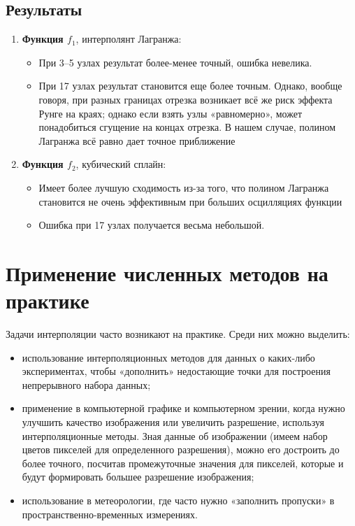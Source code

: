 \documentclass[a4paper, fleqn]{report}
\begin{document}
\section*{Результаты}

\begin{enumerate}
    \item \textbf{Функция \(f_1\)}, интерполянт Лагранжа:
    \begin{itemize}
        \item При 3--5 узлах результат более-менее точный, ошибка невелика.
        \item При 17 узлах результат становится еще более точным. Однако, вообще говоря, при разных границах отрезка возникает всё же риск эффекта Рунге на краях; однако если взять узлы «равномерно», может понадобиться сгущение на концах отрезка. В нашем случае, полином Лагранжа всё равно дает точное приближение
    \end{itemize}
    \item \textbf{Функция \(f_2\)}, кубический сплайн:
    \begin{itemize}
        \item Имеет более лучшую сходимость из-за того, что полином Лагранжа становится не очень эффективным при больших осцилляциях функции
        \item Ошибка при 17 узлах получается весьма небольшой.
    \end{itemize}
\end{enumerate}

\chapter{Применение численных методов на практике}
Задачи интерполяции часто возникают на практике. Среди них можно выделить:
\begin{itemize}
    \item использование интерполяционных методов для данных о каких-либо экспериментах, чтобы «дополнить» недостающие точки для построения непрерывного набора данных;
    \item применение в компьютерной графике и компьютерном зрении, когда нужно улучшить качество изображения или увеличить разрешение, используя интерполяционные методы. Зная данные об изображении (имеем набор цветов пикселей для определенного разрешения), можно его достроить до более точного, посчитав промежуточные значения для пикселей, которые и будут формировать большее разрешение изображения;
    \item использование в метеорологии, где часто нужно «заполнить пропуски» в пространственно-временных измерениях.
\end{itemize}
\end{document}
